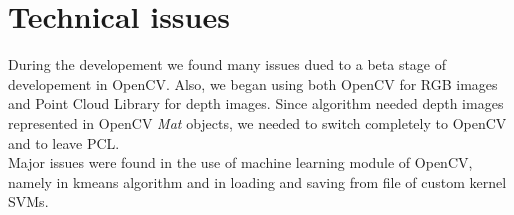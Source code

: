 \documentclass{article}
\begin{document}
\section{Technical issues}
During the developement we found many issues dued to a beta stage of developement in OpenCV. Also, we began using both OpenCV for RGB images and Point Cloud Library for depth images. Since algorithm \citep{Fanelli2011} needed depth images represented in OpenCV \textit{Mat} objects, we needed to switch completely to OpenCV and to leave PCL. \\
Major issues were found in the use of machine learning module of OpenCV, namely in kmeans algorithm and in loading and saving from file of custom kernel SVMs.

\printbibliography
\end{document}

